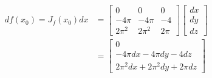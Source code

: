 \documentclass[letterpaper, 12pt]{article} %
\begin{document}
\begin{example}
\begin{align*}
df(x_{0}) = J_{f}(x_{0})dx &=
\begin{bmatrix}
0 & 0 & 0\\
-4\pi & -4\pi & -4\\
2\pi^{2} & 2\pi^{2} & 2\pi
\end{bmatrix}
\begin{bmatrix}
dx\\
dy\\
dz
\end{bmatrix}\\
&=
\begin{bmatrix}
0\\
-4\pi dx - 4\pi dy -4dz\\
2\pi^{2} dx + 2\pi^{2} dy + 2\pi dz
\end{bmatrix}
\end{align*}

\end{example}
\end{document}
